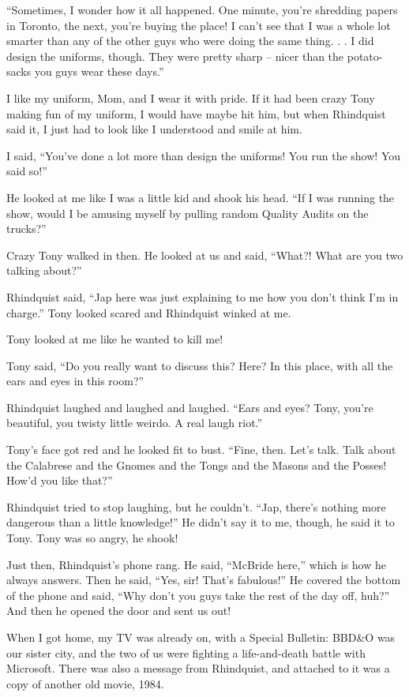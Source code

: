 “Sometimes, I wonder how it all happened. One minute, you're 
shredding papers in Toronto, the next, you're buying the place! I can't 
see that I was a whole lot smarter than any of the other guys who were 
doing the same thing. . . I did design the uniforms, though. They were 
pretty sharp -- nicer than the potato-sacks you guys wear these days.”

I like my uniform, Mom, and I wear it with pride. If it had been crazy 
Tony making fun of my uniform, I would have maybe hit him, but when 
Rhindquist said it, I just had to look like I understood and smile at 
him.

I said, “You've done a lot more than design the uniforms! You run the 
show! You said so!”

He looked at me like I was a little kid and shook his head. “If I was 
running the show, would I be amusing myself by pulling random Quality 
Audits on the trucks?”

Crazy Tony walked in then. He looked at us and said, “What?! What are 
you two talking about?”

Rhindquist said, “Jap here was just explaining to me how you don't 
think I'm in charge.” Tony looked scared and Rhindquist winked at me.

Tony looked at me like he wanted to kill me!

Tony said, “Do you really want to discuss this? Here? In this place, 
with all the ears and eyes in this room?”

Rhindquist laughed and laughed and laughed. “Ears and eyes? Tony, 
you're beautiful, you twisty little weirdo. A real laugh riot.”

Tony's face got red and he looked fit to bust. “Fine, then. Let's 
talk. Talk about the Calabrese and the Gnomes and the Tongs and the 
Masons and the Posses! How'd you like that?”

Rhindquist tried to stop laughing, but he couldn't. “Jap, there's 
nothing more dangerous than a little knowledge!” He didn't say it to 
me, though, he said it to Tony. Tony was so angry, he shook!

Just then, Rhindquist's phone rang. He said, “McBride here,” which 
is how he always answers. Then he said, “Yes, sir! That's 
fabulous!” He covered the bottom of the phone and said, “Why don't 
you guys take the rest of the day off, huh?” And then he opened the 
door and sent us out!

When I got home, my TV was already on, with a Special Bulletin: 
BBD{\&}O was our sister city, and the two of us were fighting a 
life-and-death battle with Microsoft. There was also a message from 
Rhindquist, and attached to it was a copy of another old movie, 1984.

